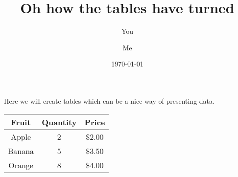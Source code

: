 \documentclass[a4paper]{article}
\begin{document}
\title{Oh how the tables have turned}
\author{You \and Me}
\date{\today}
\maketitle

Here we will create tables which can be a nice way of presenting data. 

\begin{center}
\begin{tabular} { c  c  c }
\toprule
Fruit & Quantity & Price \\ \midrule
Apple & 2 & \$2.00 \\ \midrule
Banana & 5 & \$3.50 \\ \midrule
Orange & 8 & \$4.00 \\ 
\bottomrule

\end{tabular}
\end{center}
\end{document}
